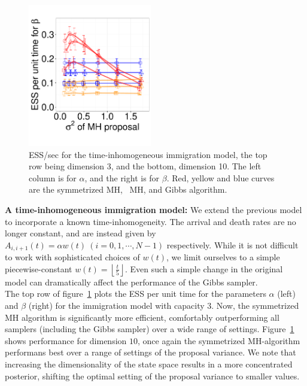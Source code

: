 {\begin{figure}
\begin{minipage}[!hp]{0.6\linewidth}
    \includegraphics [width=0.480\textwidth, angle=0]{figs/pc_10_beta.pdf}
  \end{minipage}
  \begin{minipage}[!hp]{0.04\linewidth}
  \end{minipage}
  \begin{minipage}[!hp]{0.35\linewidth}
    \vspace{-.3in}
    \caption{ESS/sec for the time-inhomogeneous immigration model, the top row 
      being dimension 3, and the bottom,
      dimension 10. The left column is for $\alpha$, and the 
    right is for $\beta$. Red, yellow and blue curves are the symmetrized MH,
  \naive\ MH, and Gibbs algorithm.}
     \label{fig:ESS_pc_10}
  \end{minipage}
    \vspace{-.2in}
  \end{figure}
\textbf{A time-inhomogeneous immigration model:}
We extend the previous model to incorporate a known time-inhomogeneity. 
The arrival and death rates are no longer constant, and are instead given by
$A_{i, i+1}(t) = \alpha w(t) \ (i =0,1,\cdots,N-1)$ respectively.
While it is not difficult to work with sophisticated choices of $w(t)$,
we limit ourselves to a simple piecewise-constant 
$w(t) = \left\lfloor \frac{t}{5} \right\rfloor$. Even such a simple
change in the original model can dramatically affect the performance
of the Gibbs sampler. \\
 The top row of figure~\ref{fig:ESS_pc_10} plots the ESS per unit time for the 
 parameters $\alpha$ (left) and $\beta$ (right) for the immigration model with 
 capacity $3$.  Now, the symmetrized MH algorithm is significantly 
 more efficient, comfortably outperforming all samplers (including the Gibbs 
 sampler) over a wide range of settings. %
 Figure~\ref{fig:ESS_pc_10} shows performance for dimension
 $10$, once again the symmetrized MH-algorithm performans best over a 
 range of settings of the proposal variance. We note that increasing the
 dimensionality of the state space results in a more concentrated posterior,
 shifting the optimal setting of the proposal variance to smaller values.

}
